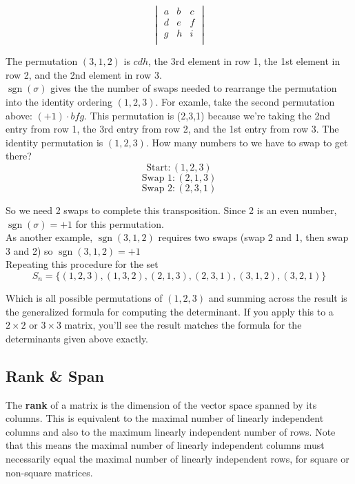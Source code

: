 \documentclass[12pt]{article}
\begin{document}
\[
\begin{vmatrix}
a & b & c \\
d & e & f \\
g & h & i \\
\end{vmatrix}
\]

The permutation \((3,1,2)\) is \(cdh\), the 3rd element in row 1, the 1st element in row 2, and the 2nd element in row 3.\\

\( \operatorname{sgn}(\sigma) \)  gives the the number of swaps needed to rearrange the permutation into the identity ordering \((1,2,3)\). For examle, take the second permutation above: \((+1) \cdot bfg\). This permutation is (2,3,1) because we're taking the 2nd entry from row 1, the 3rd entry from row 2, and the 1st entry from row 3. The identity permutation is \((1,2,3)\). How many numbers to we have to swap to get there? 
\[\text{Start}: (1,2,3)\]
\[\text{Swap 1}: (2,1,3)\]
\[\text{Swap 2}: (2,3,1)\]

So we need 2 swaps to complete this transposition. Since 2 is an even number, \( \operatorname{sgn}(\sigma)=+1\) for this permutation. \\ 

As another example,  \( \operatorname{sgn}(3,1,2)\) requires two swaps (swap 2 and 1, then swap 3 and 2) so \( \operatorname{sgn}(3,1,2)=+1\)\\

Repeating this procedure for the set 
\[S_n = \{(1, 2, 3), (1, 3, 2), (2, 1, 3), (2, 3, 1), (3, 1, 2), (3, 2, 1)\}\] 

Which is all possible permutations of \((1, 2, 3)\) and summing across the result is the generalized formula for computing the determinant. If you apply this to a \(2 \times 2\) or \(3 \times 3\) matrix, you'll see the result matches the formula for the determinants given above exactly.

\subsection{Rank \& Span}
The \textbf{rank} of a matrix is the dimension of the vector space spanned by its columns. This is equivalent to the maximal number of linearly independent columns and also to the maximum linearly independent number of rows. Note that this means the maximal number of linearly independent columns must necessarily equal the maximal number of linearly independent rows, for square or non-square matrices. \\
\end{document}
